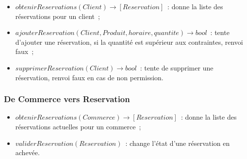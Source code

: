\documentclass[a4paper,12pt]{article}
\begin{document}
\begin{itemize}
	\item $obtenirReservations(Client) \rightarrow [Reservation]$~: donne la liste des réservations pour un client~;
	\item $ajouterReservation(Client, Produit, horaire, quantite) \rightarrow bool$~: tente d'ajouter une réservation, si la quantité est supérieur aux contraintes, renvoi faux~;
	\item $supprimerReservation(Client) \rightarrow bool$~: tente de supprimer une réservation, renvoi faux en cas de non permission.
\end{itemize}

\subsubsection{De Commerce vers Reservation}

\begin{itemize}
	\item $obtenirReservations(Commerce) \rightarrow [Reservation]$~: donne la liste des réservations actuelles pour un commerce~;
	\item $validerReservation(Reservation)$~: change l'état d'une réservation en achevée.
\end{itemize}
\end{document}
